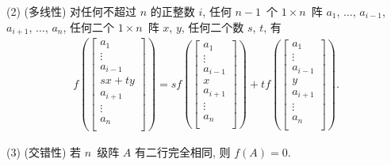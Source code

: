\begin{definition}
    (2)
    (多线性)
    对任何不超过 \(n\) 的正整数 \(i\),
    任何 \(n-1\)~个 \(1 \times n\)~阵
    \(a_1\), \(\dots\), \(a_{i-1}\),
    \(a_{i+1}\), \(\dots\), \(a_n\),
    任何二个 \(1 \times n\)~阵 \(x\), \(y\),
    任何二个数 \(s\), \(t\),
    有
    \begin{align*}
        f
        {\left(\begin{bmatrix}
                       a_1     \\
                       \vdots  \\
                       a_{i-1} \\
                       sx + ty \\
                       a_{i+1} \\
                       \vdots  \\
                       a_{n}   \\
                   \end{bmatrix}\right)}
        =
        s
        f
            {\left(\begin{bmatrix}
                               a_1     \\
                               \vdots  \\
                               a_{i-1} \\
                               x       \\
                               a_{i+1} \\
                               \vdots  \\
                               a_{n}   \\
                           \end{bmatrix}\right)}
        +
        t
        f
            {\left(\begin{bmatrix}
                               a_1     \\
                               \vdots  \\
                               a_{i-1} \\
                               y       \\
                               a_{i+1} \\
                               \vdots  \\
                               a_{n}   \\
                           \end{bmatrix}\right)}.
    \end{align*}

    (3)
    (交错性)
    若 \(n\)~级阵 \(A\) 有二行完全相同,
    则 \(f {(A)} = 0\).
\end{definition}

